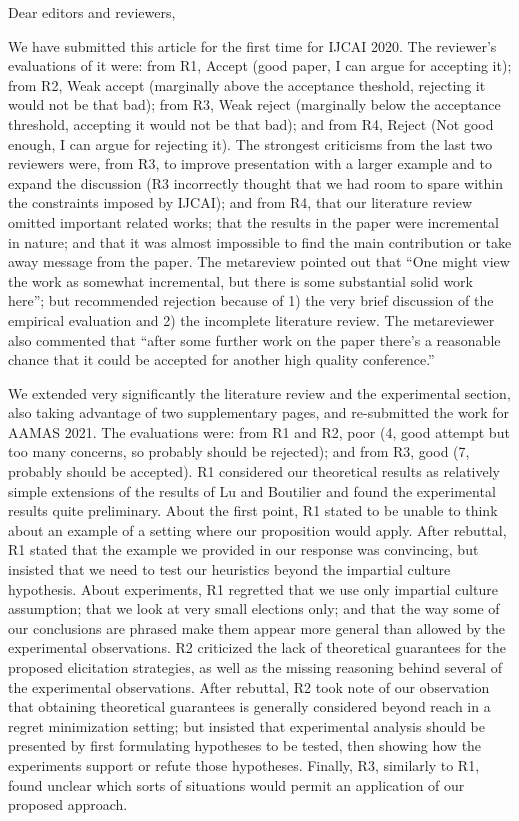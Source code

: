 
Dear editors and reviewers,

We have submitted this article for the first time for IJCAI 2020. The reviewer’s evaluations of it were: from R1, Accept (good paper, I can argue for accepting it); from R2, Weak accept (marginally above the acceptance theshold, rejecting it would not be that bad); from R3, Weak reject (marginally below the acceptance threshold, accepting it would not be that bad); and from R4, Reject (Not good enough, I can argue for rejecting it). The strongest criticisms from the last two reviewers were, from R3, to improve presentation with a larger example and to expand the discussion (R3 incorrectly thought that we had room to spare within the constraints imposed by IJCAI); and from R4, that our literature review omitted important related works; that the results in the paper were incremental in nature; and that it was almost impossible to find the main contribution or take away message from the paper. The metareview pointed out that “One might view the work as somewhat incremental, but there is some substantial solid work here”; but recommended rejection because of 1) the very brief discussion of the empirical evaluation and 2) the incomplete literature review. The metareviewer also commented that “after some further work on the paper there's a reasonable chance that it could be accepted for another high quality conference.”

We extended very significantly the literature review and the experimental section, also taking advantage of two supplementary pages, and re-submitted the work for AAMAS 2021. The evaluations were: from R1 and R2, poor (4, good attempt but too many concerns, so probably should be rejected); and from R3, good (7, probably should be accepted). R1 considered our theoretical results as relatively simple extensions of the results of Lu and Boutilier and found the experimental results quite preliminary. About the first point, R1 stated to be unable to think about an example of a setting where our proposition would apply. After rebuttal, R1 stated that the example we provided in our response was convincing, but insisted that we need to test our heuristics beyond the impartial culture hypothesis. About experiments, R1 regretted that we use only impartial culture assumption; that we look at very small elections only; and that the way some of our conclusions are phrased make them appear more general than allowed by the experimental observations. R2 criticized the lack of theoretical guarantees for the proposed elicitation strategies, as well as the missing reasoning behind several of the experimental observations. After rebuttal, R2 took note of our observation that obtaining theoretical guarantees is generally considered beyond reach in a regret minimization setting; but insisted that experimental analysis should be presented by first formulating hypotheses to be tested, then showing how the experiments support or refute those hypotheses. Finally, R3, similarly to R1, found unclear which sorts of situations would permit an application of our proposed approach.
